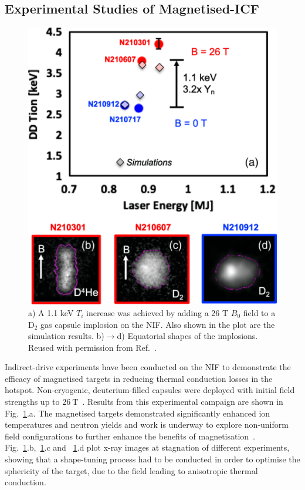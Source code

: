 \subsection{Experimental Studies of Magnetised-ICF}%
\label{sec:Res2_magicf_prevwork}

\begin{figure}[t!]
    \includegraphics[width=0.5\linewidth]{Results2/Images/magnif_yield_inc.png}
    \centering
    \caption{a) A 1.1 keV $T_i$ increase was achieved by adding a 26 T $B_0$ field to a D${}_{2}$ gas capsule implosion on the \ac{NIF}.
    Also shown in the plot are the simulation results.
    b)$\rightarrow$d) Equatorial shapes of the implosions.
    Reused with permission from Ref.~\cite{moody_increased_2022}.}%
    \label{fig:Res2_moody_magnif}
\end{figure}

Indirect-drive experiments have been conducted on the \ac{NIF} to demonstrate the efficacy of magnetised targets in reducing thermal conduction losses in the hotspot.
Non-cryogenic, deuterium-filled capsules were deployed with initial field strengths up to $26\ \text{T}$~\cite{moody_increased_2022}.
Results from this experimental campaign are shown in Fig.~\ref{fig:Res2_moody_magnif}.a.
The magnetised targets demonstrated significantly enhanced ion temperatures and neutron yields and work is underway to explore non-uniform field configurations to further enhance the benefits of magnetisation~\cite{walsh_application_2023}.
Fig.~\ref{fig:Res2_moody_magnif}.b,~\ref{fig:Res2_moody_magnif}.c and ~\ref{fig:Res2_moody_magnif}.d plot x-ray images at stagnation of different experiments, showing that a shape-tuning process had to be conducted in order to optimise the sphericity of the target, due to the field leading to anisotropic thermal conduction.


